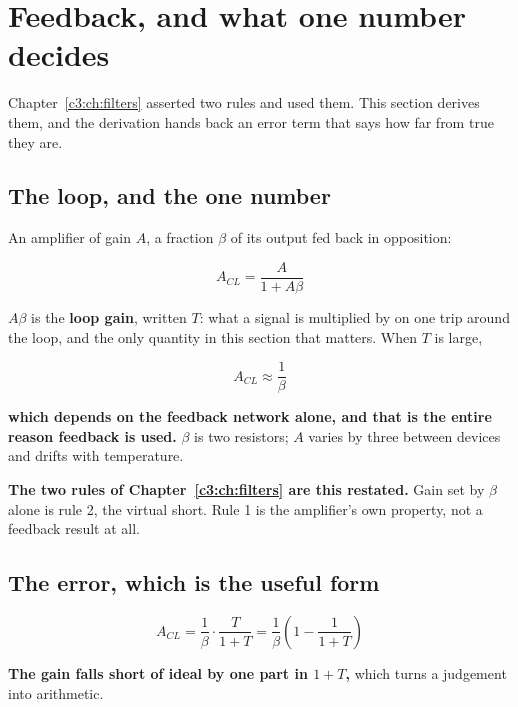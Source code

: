 
\section{Feedback, and what one number decides}
\label{c4:app:a}

Chapter~\ref{c3:ch:filters} asserted two rules and used them. This section derives them, and the derivation hands back an error term that says how far from true they are.

\subsection{The loop, and the one number}
\label{c4:sec:a1}
An amplifier of gain $A$, a fraction $\beta$ of its output fed back in opposition:

\[
  A_{CL} = \frac{A}{1 + A\beta}
\]

$A\beta$ is the \textbf{loop gain}, written $T$: what a signal is multiplied by on one trip around the loop, and the only quantity in this section that matters. When $T$ is large,

\[
  A_{CL} \approx \frac{1}{\beta}
\]

\textbf{which depends on the feedback network alone, and that is the entire reason feedback is used.} $\beta$ is two resistors; $A$ varies by three between devices and drifts with temperature.

\textbf{The two rules of Chapter~\ref{c3:ch:filters} are this restated.} Gain set by $\beta$ alone is rule 2, the virtual short. Rule 1 is the amplifier's own property, not a feedback result at all.

\subsection{The error, which is the useful form}
\label{c4:sec:a2}
\[
  A_{CL} = \frac{1}{\beta} \cdot \frac{T}{1 + T} = \frac{1}{\beta}\left(1 - \frac{1}{1+T}\right)
\]

\textbf{The gain falls short of ideal by one part in $1 + T$,} which turns a judgement into arithmetic.


